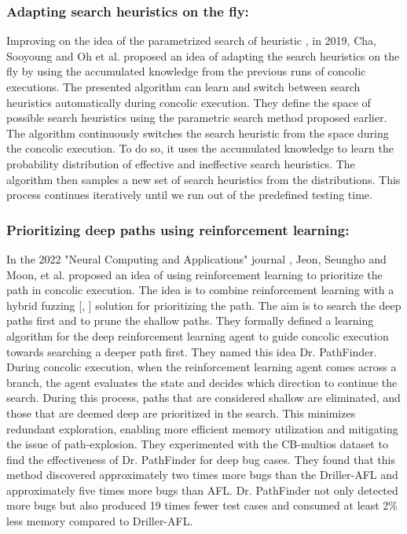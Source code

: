 \documentclass[ runningheads,
               a4paper]{llncs}
\begin{document}
\subsubsection{Adapting search heuristics on the fly:}
Improving on the idea of the parametrized search of heuristic \cite{cha2018automatically}, in 2019, Cha, Sooyoung and Oh et al. proposed an idea \cite{adapt2019heuristic} of adapting the search heuristics on the fly by using the accumulated knowledge from the previous runs of concolic executions. The presented algorithm can learn and switch between search heuristics automatically during concolic execution. They define the space of possible search heuristics using the parametric search method \cite{adapt2019heuristic} proposed earlier. The algorithm continuously switches the search heuristic from the space during the concolic execution. To do so, it uses the accumulated knowledge to learn the probability distribution of effective and ineffective search heuristics. The algorithm then samples a new set of search heuristics from the distributions. This process continues iteratively until we run out of the predefined testing time.


\subsubsection{Prioritizing deep paths using reinforcement learning:}
In the 2022 "Neural Computing and Applications" journal \cite{drPathfinder2022}, Jeon, Seungho and Moon, et al. proposed an idea \cite[Dr. PathFinder]{drPathfinder2022} of using reinforcement learning to prioritize the path in concolic execution. The idea is to combine reinforcement learning with a hybrid fuzzing [\cite{miller1990empirical}, \cite{godefroid2012sage}] solution for prioritizing the path. The aim is to search the deep paths first and to prune the shallow paths. They formally defined a learning algorithm for the deep reinforcement learning agent to guide concolic execution towards searching a deeper path first. They named this idea Dr. PathFinder. During concolic execution, when the reinforcement learning agent comes across a branch, the agent evaluates the state and decides which direction to continue the search. During this process, paths that are considered shallow are eliminated, and those that are deemed deep are prioritized in the search. This minimizes redundant exploration, enabling more efficient memory utilization and mitigating the issue of path-explosion. They experimented with the CB-multios dataset to find the effectiveness of Dr. PathFinder for deep bug cases.  They found that this method discovered approximately two times more bugs than the Driller-AFL and approximately five times more bugs than AFL. Dr. PathFinder not only detected more bugs but also produced 19 times fewer test cases and consumed at least 2\% less memory compared to Driller-AFL.
\end{document}
